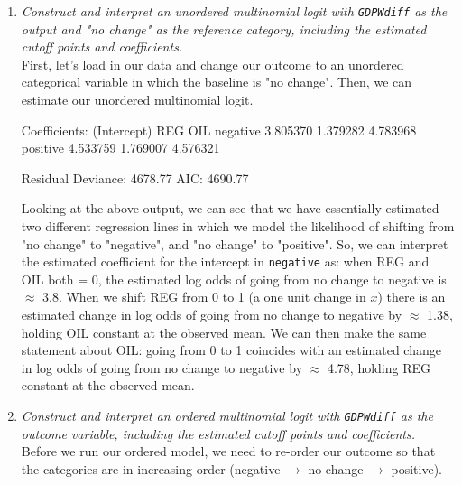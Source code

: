 \documentclass[12pt,letterpaper]{article}
\begin{document}
\begin{enumerate}
	\item \emph{Construct and interpret an unordered multinomial logit with \texttt{GDPWdiff} as the output and "no change" as the reference category, including the estimated cutoff points and coefficients.}\\
	
	First, let's load in our data and change our outcome to an unordered categorical variable in which the baseline is "no change". Then, we can estimate our unordered multinomial logit.\\
	
	  
	
	\begin{verbnobox}[\footnotesize]
		Coefficients:
		(Intercept)      REG      OIL
		negative    3.805370 1.379282 4.783968
		positive    4.533759 1.769007 4.576321
		
		Residual Deviance: 4678.77 
		AIC: 4690.77 
	\end{verbnobox}			
	
\normalsize	Looking at the above output, we can see that we have essentially estimated two different regression lines in which we model the likelihood of shifting from "no change" to "negative", and "no change" to "positive". So, we can interpret the estimated coefficient for the intercept in \texttt{negative} as: when REG and OIL both = 0, the estimated log odds of going from no change to negative is $\approx$ 3.8. When we shift REG from 0 to 1 (a one unit change in $x$) there is an estimated change in log odds of going from no change to negative by  $\approx$ 1.38, holding OIL constant at the observed mean. We can then make the same statement about OIL: going from 0 to 1 coincides with an estimated change in log odds of going from no change to negative by  $\approx$ 4.78, holding REG constant at the observed mean.\\
	
	\item \emph{Construct and interpret an ordered multinomial logit with \texttt{GDPWdiff} as the outcome variable, including the estimated cutoff points and coefficients.}\\
	
	Before we run our ordered model, we need to re-order our outcome so that the categories are in increasing order (negative $\rightarrow$ no change $\rightarrow$ positive).\\
	

\end{enumerate}
\end{document}
